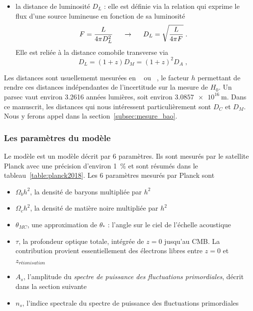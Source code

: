 \documentclass[11pt, twoside, a4paper, openright]{report}
\begin{document}
\begin{itemize}[label=$\bullet$]
\item la distance de luminosité $D_L$ : elle est définie via la relation qui exprime le flux d'une source lumineuse en fonction de sa luminosité
  \begin{equation}
    \label{eq:dist_lum}
    F = \frac{L}{4\pi D_L^2} \hspace{0.5cm} \rightarrow \hspace{0.5cm} D_L = \sqrt{\frac{L}{4 \pi F}}  \; .
  \end{equation}
  Elle est reliée à la distance comobile transverse via
  \begin{equation}
    D_L = (1+z) D_M = (1+z)^2 D_A  \; ,
  \end{equation}
\end{itemize}

Les distances sont usuellememt mesurées en \si{\perh\kpc} ou \si{\perh\Mpc}, le facteur $h$ permettant de rendre ces distances indépendantes de l'incertitude sur la mesure de $H_{0}$. Un parsec vaut environ \num{3.2616} années lumières, soit environ $\SI{3,0857 e16}{\meter}$.
Dans ce manuscrit, les distances qui nous intéressent particulièrement sont $D_C$ et $D_M$. Nous y ferons appel dans la section~\ref{subsec:mesure_bao}.

\subsubsection{Les paramètres du modèle} 
Le modèle \lcdm{} est un modèle décrit par 6 paramètres. Ils sont mesurés par le satellite Planck \autocite{Collaboration2018} avec une précision d'environ 1~\% et sont résumés dans le tableau~\ref{table:planck2018}. Les 6 paramètres mesurés par Planck sont
\begin{itemize}
\item $\Omega_bh^2$, la densité de baryons multipliée par $h^2$
\item $\Omega_ch^2$, la densité de matière noire multipliée par $h^2$
\item $\theta_{MC}$, une approximation de $\theta_*$ : l'angle sur le ciel de l'échelle acoustique
\item $\tau$, la profondeur optique totale, intégrée de $z=0$ jusqu'au CMB. La contribution provient essentiellement des électrons libres entre $z = 0$ et $z_{réionisation}$
\item $A_s$, l'amplitude du \emph{spectre de puissance des fluctuations primordiales}, décrit dans la section suivante
\item $n_s$, l'indice spectrale du spectre de puissance des fluctuations primordiales
\end{itemize}
\end{document}
